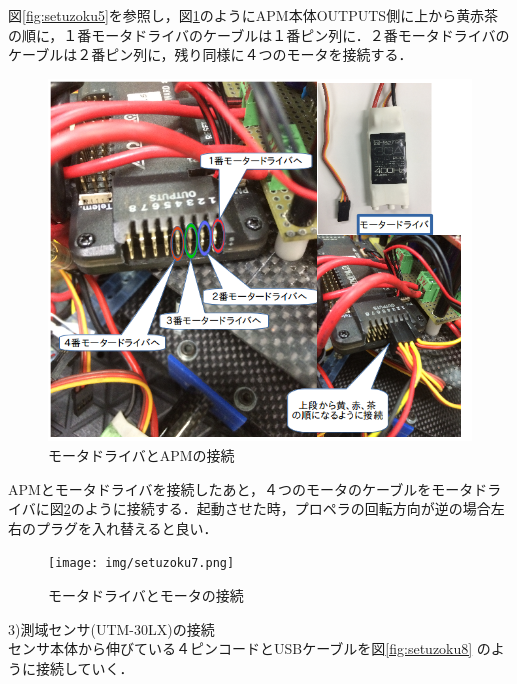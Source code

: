 \documentclass[12pt,oneside]{sotsuken_paper}
\begin{document}
図\ref{fig:setuzoku5}を参照し，図\ref{fig:setuzoku6}のようにAPM本体OUTPUTS側に上から黄赤茶の順に，１番モータドライバのケーブルは１番ピン列に．２番モータドライバのケーブルは２番ピン列に，残り同様に４つのモータを接続する．

\begin{figure}[H]\cite{si2014}
\begin{center}
\includegraphics[width=140mm]{img/setuzoku6.png}
\end{center}
\caption{モータドライバとAPMの接続}
\label{fig:setuzoku6}
\end{figure}

APMとモータドライバを接続したあと，４つのモータのケーブルをモータドライバに図\ref{fig:setuzoku7}のように接続する．起動させた時，プロペラの回転方向が逆の場合左右のプラグを入れ替えると良い．

\begin{figure}[H]
\begin{center}
\texttt{[image: img/setuzoku7.png]}
\end{center}
\caption{モータドライバとモータの接続}
\label{fig:setuzoku7}
\end{figure}

3)測域センサ(UTM-30LX)の接続\\
  センサ本体から伸びている４ピンコードとUSBケーブルを図\ref   {fig:setuzoku8}  のように接続していく．\\
\end{document}
